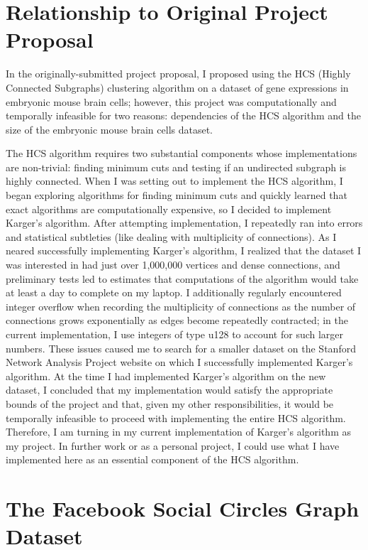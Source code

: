 \documentclass[10pt]{article}
\begin{document}
{\section{Relationship to Original Project Proposal}

In the originally-submitted project proposal, I proposed using the HCS (Highly Connected Subgraphs) clustering algorithm on a dataset of gene expressions in embryonic mouse brain cells; however, this project was computationally and temporally infeasible for two reasons: dependencies of the HCS algorithm and the size of the embryonic mouse brain cells dataset.

The HCS algorithm requires two substantial components whose implementations are non-trivial: finding minimum cuts and testing if an undirected subgraph is highly connected.
When I was setting out to implement the HCS algorithm, I began exploring algorithms for finding minimum cuts and quickly learned that exact algorithms are computationally expensive, so I decided to implement Karger's algorithm.
After attempting implementation, I repeatedly ran into errors and statistical subtleties (like dealing with multiplicity of connections).
As I neared successfully implementing Karger's algorithm, I realized that the dataset I was interested in had just over 1,000,000 vertices and dense connections, and preliminary tests led to estimates that computations of the algorithm would take at least a day to complete on my laptop.
I additionally regularly encountered integer overflow when recording the multiplicity of connections as the number of connections grows exponentially as edges become repeatedly contracted; in the current implementation, I use integers of type u128 to account for such larger numbers.
These issues caused me to search for a smaller dataset on the Stanford Network Analysis Project website on which I successfully implemented Karger's algorithm.
At the time I had implemented Karger's algorithm on the new dataset, I concluded that my implementation would satisfy the appropriate bounds of the project and that, given my other responsibilities, it would be temporally infeasible to proceed with implementing the entire HCS algorithm.
Therefore, I am turning in my current implementation of Karger's algorithm as my project.
In further work or as a personal project, I could use what I have implemented here as an essential component of the HCS algorithm.

\section{The Facebook Social Circles Graph Dataset}

}
\end{document}
